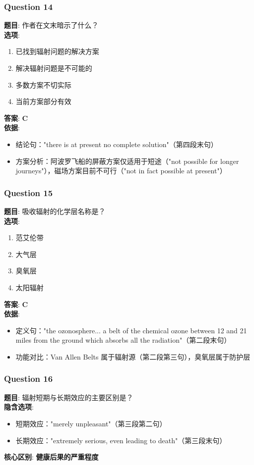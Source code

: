 \documentclass{article}
\begin{document}
\subsubsection*{Question 14}
\textbf{题目}: 作者在文末暗示了什么？ \\
\textbf{选项}: 
\begin{enumerate}[label=\Alph*)]
    \item 已找到辐射问题的解决方案
    \item 解决辐射问题是不可能的
    \item 多数方案不切实际
    \item 当前方案部分有效
\end{enumerate}
\textbf{答案}: \textbf{C} \\
\textbf{依据}:
\begin{itemize}
    \item 结论句："there is at present no complete solution"（第四段末句）
    \item 方案分析：阿波罗飞船的屏蔽方案仅适用于短途（"not possible for longer journeys"），磁场方案目前不可行（"not in fact possible at present"）
\end{itemize}

\subsubsection*{Question 15}
\textbf{题目}: 吸收辐射的化学层名称是？ \\
\textbf{选项}: 
\begin{enumerate}[label=\Alph*)]
    \item 范艾伦带
    \item 大气层
    \item 臭氧层
    \item 太阳辐射
\end{enumerate}
\textbf{答案}: \textbf{C} \\
\textbf{依据}:
\begin{itemize}
    \item 定义句："the ozonosphere... a belt of the chemical ozone between 12 and 21 miles from the ground which absorbs all the radiation"（第二段末句）
    \item 功能对比：Van Allen Belts 属于辐射源（第二段第三句），臭氧层属于防护层
\end{itemize}

\subsubsection*{Question 16}
\textbf{题目}: 辐射短期与长期效应的主要区别是？ \\
\textbf{隐含选项}:
\begin{itemize}
    \item 短期效应："merely unpleasant"（第三段第二句）
    \item 长期效应："extremely serious, even leading to death"（第三段末句）
\end{itemize}
\textbf{核心区别}: \textbf{健康后果的严重程度}
\end{document}
